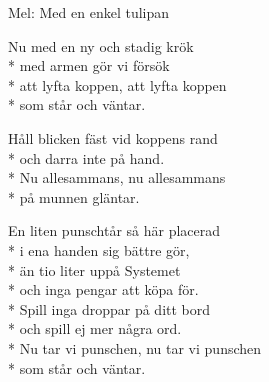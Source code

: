 \begin{SongText}[Födelsedagspunsch]
    \begin{SongInfo}
        Mel: Med en enkel tulipan
    \end{SongInfo}
    \begin{SongVerse}
        Nu med en ny och stadig krök\\*%
        med armen gör vi försök\\*%
        att lyfta koppen, att lyfta koppen\\*%
        som står och väntar.
    \end{SongVerse}
    \begin{SongVerse}
        Håll blicken fäst vid koppens rand\\*%
        och darra inte på hand.\\*%
        Nu allesammans, nu allesammans\\*%
        på munnen gläntar.
    \end{SongVerse}
    \begin{SongVerse}
        En liten punschtår så här placerad\\*%
        i ena handen sig bättre gör,\\*%
        än tio liter uppå Systemet\\*%
        och inga pengar att köpa för.\\*%
        Spill inga droppar på ditt bord\\*%
        och spill ej mer några ord.\\*%
        Nu tar vi punschen, nu tar vi punschen\\*%
        som står och väntar.
    \end{SongVerse}
\end{SongText}
